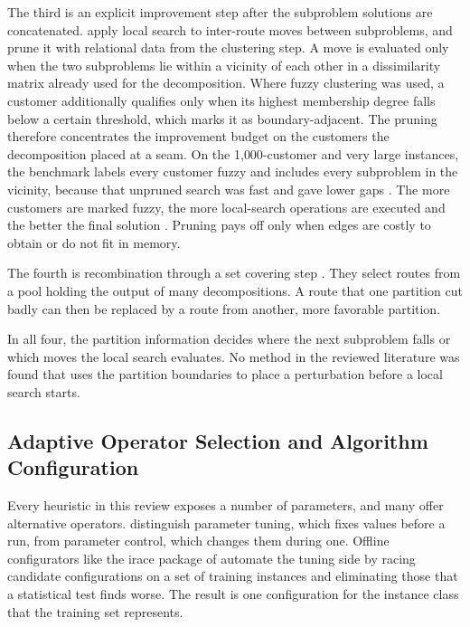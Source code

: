 The third is an explicit improvement step after the subproblem solutions are concatenated. \citet{kerscherDecomposerouteimproveFrameworkSolving2025} apply local search to inter-route moves between subproblems, and prune it with relational data from the clustering step. A move is evaluated only when the two subproblems lie within a vicinity of each other in a dissimilarity matrix already used for the decomposition. Where fuzzy clustering was used, a customer additionally qualifies only when its highest membership degree falls below a certain threshold, which marks it as boundary-adjacent. The pruning therefore concentrates the improvement budget on the customers the decomposition placed at a seam. On the 1{,}000-customer and very large instances, the benchmark labels every customer fuzzy and includes every subproblem in the vicinity, because that unpruned search was fast and gave lower gaps \citep[Section~5.3]{kerscherDecomposerouteimproveFrameworkSolving2025}. The more customers are marked fuzzy, the more local-search operations are executed and the better the final solution \citep[Section~5.2.4]{kerscherDecomposerouteimproveFrameworkSolving2025}. Pruning pays off only when edges are costly to obtain or do not fit in memory.

The fourth is recombination through a set covering step \citep{kerscherSolvingHeterogeneousVehicle}. They select routes from a pool holding the output of many decompositions. A route that one partition cut badly can then be replaced by a route from another, more favorable partition.

In all four, the partition information decides where the next subproblem falls or which moves the local search evaluates. No method in the reviewed literature was found that uses the partition boundaries to place a perturbation before a local search starts.

\subsection{Adaptive Operator Selection and Algorithm Configuration}\label{sec:lit-adaptive-control}

Every heuristic in this review exposes a number of parameters, and many offer alternative operators. \citet{eibenParameterControlEvolutionary1999} distinguish parameter tuning, which fixes values before a run, from parameter control, which changes them during one. Offline configurators like the irace package of \citet{lopezibanez2016irace} automate the tuning side by racing candidate configurations on a set of training instances and eliminating those that a statistical test finds worse. The result is one configuration for the instance class that the training set represents.

